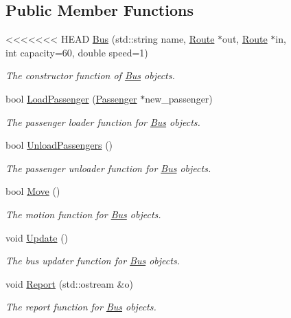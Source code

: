 \begin{figure}[H]
\begin{center}
\subsection*{Public Member Functions}
\begin{DoxyCompactItemize}
\item 
<<<<<<< HEAD
\hyperlink{classBus_aa28c3c318b6993f3a3aebf211daa9217}{Bus} (std\+::string name, \hyperlink{classRoute}{Route} $\ast$out, \hyperlink{classRoute}{Route} $\ast$in, int capacity=60, double speed=1)
\begin{DoxyCompactList}\small\item\em The constructor function of \hyperlink{classBus}{Bus} objects. \end{DoxyCompactList}\item 
bool \hyperlink{classBus_aae72290f9daf683b3068428eee0a9ee7}{Load\+Passenger} (\hyperlink{classPassenger}{Passenger} $\ast$new\+\_\+passenger)
\begin{DoxyCompactList}\small\item\em The passenger loader function for \hyperlink{classBus}{Bus} objects. \end{DoxyCompactList}\item 
bool \hyperlink{classBus_a352bd5f926705ed4dd91d7fdea6a7fc9}{Unload\+Passengers} ()
\begin{DoxyCompactList}\small\item\em The passenger unloader function for \hyperlink{classBus}{Bus} objects. \end{DoxyCompactList}\item 
bool \hyperlink{classBus_a5e667186d6db0916ebab0e4eff3312c8}{Move} ()
\begin{DoxyCompactList}\small\item\em The motion function for \hyperlink{classBus}{Bus} objects. \end{DoxyCompactList}\item 
void \hyperlink{classBus_a9896f74f16966f7621d0dfafff0ec6b4}{Update} ()
\begin{DoxyCompactList}\small\item\em The bus updater function for \hyperlink{classBus}{Bus} objects. \end{DoxyCompactList}\item 
void \hyperlink{classBus_a695e790984f5cf7bbec85fe422466b48}{Report} (std\+::ostream \&o)
\begin{DoxyCompactList}\small\item\em The report function for \hyperlink{classBus}{Bus} objects. \end{DoxyCompactList}\item 

\end{DoxyCompactItemize}
\end{center}
\end{figure}

